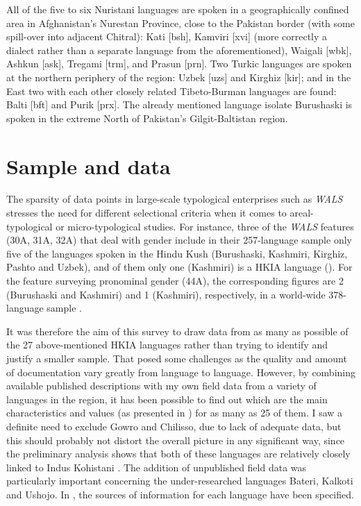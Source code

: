\documentclass[output=collectionpaper]{langsci/langscibook}
\begin{document}
All of the five to six Nuristani languages are spoken in a geographically confined area in Afghanistan's Nurestan Province, close to the Pakistan border (with some spill-over into adjacent Chitral): Kati [bsh], Kamviri [xvi] (more correctly a dialect rather than a separate language from the aforementioned), Waigali [wbk], Ashkun [ask], Tregami [trm], and Prasun [prn]. Two Turkic languages are spoken at the northern periphery of the region: Uzbek [uzs] and Kirghiz [kir]; and in the East two with each other closely related Tibeto-Burman languages are found: Balti [bft] and Purik [prx]. The already mentioned language isolate Burushaski is spoken in the extreme North of Pakistan's Gilgit-Baltistan region.

\section{Sample and data}
The sparsity of data points in large-scale typological enterprises such as \textit{WALS} stresses the need for different selectional criteria when it comes to areal\hyp{}typological or micro-typological studies. For instance, three of the \textit{WALS} features (30A, 31A, 32A) that deal with gender include in their 257-language sample only five of the languages spoken in the Hindu Kush (Burushaski, Kashmiri, Kirghiz, Pashto and Uzbek), and of them only one (Kashmiri) is a HKIA language (\citealt{Corbett2013,Corbett2013a,Corbett2013b}). For the feature surveying pronominal gender (44A), the corresponding figures are 2 (Burushaski and Kashmiri) and 1 (Kashmiri), respectively, in a world-wide 378-language sample \citep{Siewierska2013}.

It was therefore the aim of this survey to draw data from as many as possible of the 27 above-mentioned HKIA languages rather than trying to identify and justify a smaller sample. That posed some challenges as the quality and amount of documentation vary greatly from language to language. However, by combining available published descriptions with my own field data from a variety of languages in the region, it has been possible to find out which are the main characteristics and values (as presented in ) for as many as 25 of them. I saw a definite need to exclude Gowro and Chilisso, due to lack of adequate data, but this should probably not distort the overall picture in any significant way, since the preliminary analysis shows that both of these languages are relatively closely linked to Indus Kohistani \citep[874]{Bashir2003}. The addition of unpublished field data was particularly important concerning the under-researched languages Bateri, Kalkoti and Ushojo. In , the sources of information for each language have been specified.
\end{document}
